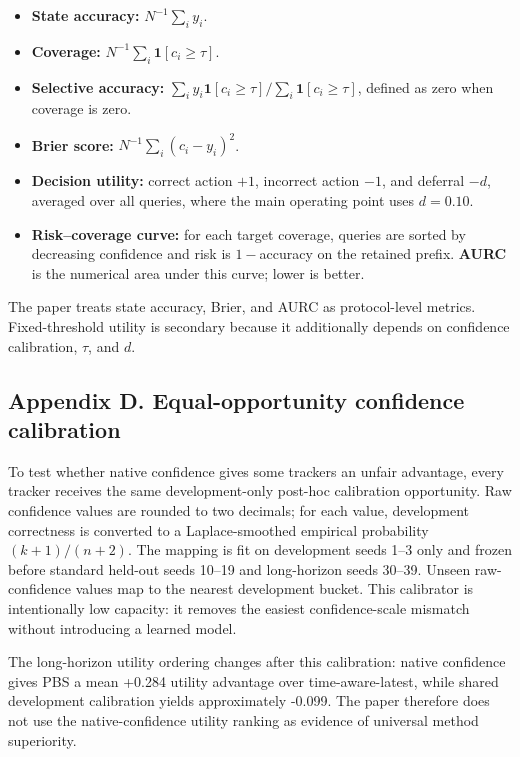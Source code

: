 \begin{itemize}
\tightlist
\item
  \textbf{State accuracy:} \(N^{-1}\sum_i y_i\).
\item
  \textbf{Coverage:} \(N^{-1}\sum_i \mathbf{1}[c_i\ge\tau]\).
\item
  \textbf{Selective accuracy:}
  \(\sum_i y_i\mathbf{1}[c_i\ge\tau] / \sum_i \mathbf{1}[c_i\ge\tau]\),
  defined as zero when coverage is zero.
\item
  \textbf{Brier score:} \(N^{-1}\sum_i(c_i-y_i)^2\).
\item
  \textbf{Decision utility:} correct action \(+1\), incorrect action
  \(-1\), and deferral \(-d\), averaged over all queries, where the main
  operating point uses \(d=0.10\).
\item
  \textbf{Risk--coverage curve:} for each target coverage, queries are
  sorted by decreasing confidence and risk is \(1-\)accuracy on the
  retained prefix. \textbf{AURC} is the numerical area under this curve;
  lower is better.
\end{itemize}

The paper treats state accuracy, Brier, and AURC as protocol-level
metrics. Fixed-threshold utility is secondary because it additionally
depends on confidence calibration, \(\tau\), and \(d\).

\subsection{Appendix D. Equal-opportunity confidence
calibration}\label{appendix-d.-equal-opportunity-confidence-calibration}

To test whether native confidence gives some trackers an unfair
advantage, every tracker receives the same development-only post-hoc
calibration opportunity. Raw confidence values are rounded to two
decimals; for each value, development correctness is converted to a
Laplace-smoothed empirical probability \((k+1)/(n+2)\). The mapping is
fit on development seeds 1--3 only and frozen before standard held-out
seeds 10--19 and long-horizon seeds 30--39. Unseen raw-confidence values
map to the nearest development bucket. This calibrator is intentionally
low capacity: it removes the easiest confidence-scale mismatch without
introducing a learned model.

The long-horizon utility ordering changes after this calibration: native
confidence gives PBS a mean +0.284 utility advantage over
time-aware-latest, while shared development calibration yields
approximately -0.099. The paper therefore does not use the
native-confidence utility ranking as evidence of universal method
superiority.

